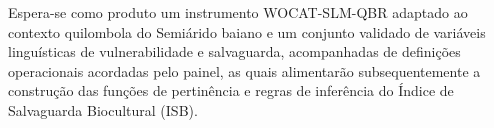 Espera-se como produto um instrumento WOCAT-SLM-QBR adaptado ao contexto quilombola do Semiárido baiano e um conjunto validado de variáveis linguísticas de vulnerabilidade e salvaguarda, acompanhadas de definições operacionais acordadas pelo painel, as quais alimentarão subsequentemente a construção das funções de pertinência e regras de inferência do Índice de Salvaguarda Biocultural (ISB).
